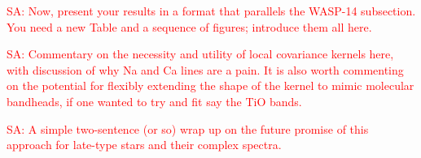 \documentclass[iop,floatfix]{emulateapj}
\newcommand{\vT}{ {\bm \Theta}}
\newcommand{\comm}[1]{ \textcolor{red}{SA: #1}}
\begin{document}
\comm{Now, present your results in a format that parallels the WASP-14 subsection.  You need a new 
Table and a sequence of figures; introduce them all here.}

\comm{Commentary on the necessity and utility of local covariance kernels here, with discussion of why Na and Ca 
lines are a pain.  It is also worth commenting on the potential for flexibly extending the shape of 
the kernel to mimic molecular bandheads, if one wanted to try and fit say the TiO bands.}

\comm{A simple two-sentence (or so) wrap up on the future promise of this approach for late-type 
stars and their complex spectra.}

\end{document}
